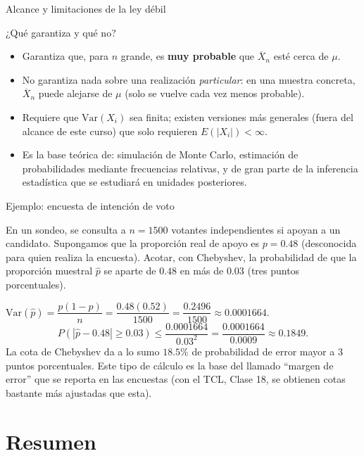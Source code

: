 \documentclass[aspectratio=169,11pt]{beamer}
\begin{document}
\begin{frame}{Alcance y limitaciones de la ley débil}
\begin{alertblock}{¿Qué garantiza y qué no?}
\begin{itemize}
\item Garantiza que, para $n$ grande, es \textbf{muy probable} que $\overline X_n$ esté cerca de $\mu$.
\item No garantiza nada sobre una realización \emph{particular}: en una muestra concreta, $\overline X_n$ puede alejarse de $\mu$ (solo se vuelve cada vez menos probable).
\item Requiere que $\text{Var}(X_i)$ sea finita; existen versiones más generales (fuera del alcance de este curso) que solo requieren $E(|X_i|)<\infty$.
\item Es la base teórica de: simulación de Monte Carlo, estimación de probabilidades mediante frecuencias relativas, y de gran parte de la inferencia estadística que se estudiará en unidades posteriores.
\end{itemize}
\end{alertblock}
\end{frame}

\begin{frame}{Ejemplo: encuesta de intención de voto}
\begin{example}
En un sondeo, se consulta a $n=1500$ votantes independientes si apoyan a un candidato. Supongamos que la proporción real de apoyo es $p=0.48$ (desconocida para quien realiza la encuesta). Acotar, con Chebyshev, la probabilidad de que la proporción muestral $\hat p$ se aparte de $0.48$ en más de $0.03$ (tres puntos porcentuales).
\end{example}

\medskip
$\text{Var}(\hat p) = \dfrac{p(1-p)}{n} = \dfrac{0.48(0.52)}{1500} = \dfrac{0.2496}{1500} \approx 0.0001664$.
\[
P(|\hat p - 0.48|\geq 0.03) \leq \frac{0.0001664}{0.03^2} = \frac{0.0001664}{0.0009} \approx 0.1849.
\]
La cota de Chebyshev da a lo sumo $18.5\%$ de probabilidad de error mayor a $3$ puntos porcentuales. Este tipo de cálculo es la base del llamado ``margen de error'' que se reporta en las encuestas (con el TCL, Clase 18, se obtienen cotas bastante más ajustadas que esta).
\end{frame}

\section{Resumen}
\end{document}
